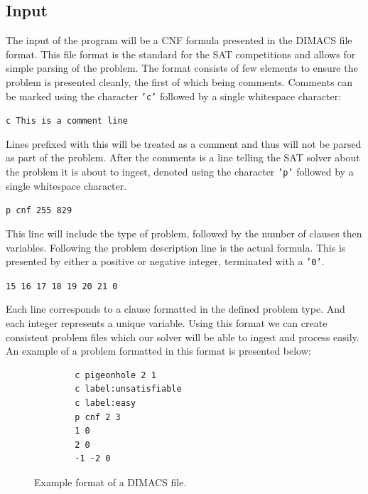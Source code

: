 \documentclass{article}
\begin{document}
\subsection{Input}
The input of the program will be a CNF formula presented in the DIMACS file format. This file format
is the standard for the SAT competitions and allows for simple parsing of the problem. The format
consists of few elements to ensure the problem is presented cleanly, the first of which being
comments. Comments can be marked using the character \texttt{'c'} followed by a single whitespace
character:

\begin{center}
    \texttt{c This is a comment line}
\end{center}

Lines prefixed with this will be treated as a
comment and thus will not be parsed as part of the problem. After the comments is a line telling the
SAT solver about the problem it is about to ingest, denoted using the character \texttt{'p'}
followed by a single whitespace character.

\begin{center}
    \texttt{p cnf 255 829}
\end{center}

This line will include the type of problem, followed by the number of clauses then
variables. Following the problem description line is the actual formula. This is presented by either
a positive or negative integer, terminated with a \texttt{'0'}.

\begin{center}
    \texttt{15 16 17 18 19 20 21 0}
\end{center}

Each line corresponds to a clause formatted in the defined problem type. And each integer represents
a unique variable. Using this format we can create consistent problem files which our solver will be
able to ingest and process easily. An example of a problem formatted in this format is presented
below:

\begin{figure}[h]
    \centering
    \begin{lstlisting}
        c pigeonhole 2 1
        c label:unsatisfiable
        c label:easy
        p cnf 2 3
        1 0
        2 0
        -1 -2 0
    \end{lstlisting}
    \caption{Example format of a DIMACS file.}
\end{figure}
\end{document}
